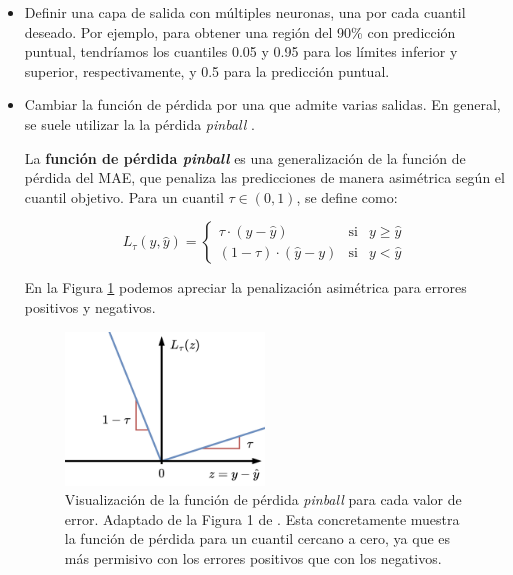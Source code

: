 \begin{itemize}

    \item Definir una capa de salida con múltiples neuronas, una por cada cuantil deseado. Por ejemplo, para 
    obtener una región del 90\% con predicción puntual, tendríamos los cuantiles 0.05 y 0.95 para los límites
    inferior y superior, respectivamente, y 0.5 para la predicción puntual. 

    \item Cambiar la función de pérdida por una que admite varias salidas. En general, se suele utilizar la 
    la pérdida \textit{pinball} \cite{steinwart2011}.

    La \textbf{función de pérdida \textit{pinball}} es una generalización de la función de pérdida del MAE,
    que penaliza las predicciones de manera asimétrica según el cuantil objetivo. Para un cuantil 
    $\tau \in \left( 0,1\right)$, se define como:


    $$
    L_\tau(y,\hat{y}) = \left\{
        \begin{array}{rcl}
            \tau \cdot (y-\hat{y}) & \mbox{si} & y \ge \hat{y}
            \\
            (1-\tau) \cdot (\hat{y}-y) & \mbox{si} & y < \hat{y}
        \end{array}
    \right.
    $$

    En la Figura \ref{fig:pinball_loss} podemos apreciar la penalización asimétrica para errores positivos y 
    negativos. 

    \begin{figure}[h]
        \centering
        \includegraphics[width=0.5\textwidth]{capitulos/cap_04/imagenes/pinball_loss.png}
        \caption[
            Visualización de la función de pérdida \textit{pinball} para cada valor de error.
        ]{
            Visualización de la función de pérdida \textit{pinball} para cada valor de error.
            Adaptado de la Figura 1 de \cite{romano2019}.
            Esta concretamente muestra la función de pérdida para un cuantil cercano a cero, 
            ya que es más permisivo con los errores positivos que con los negativos.
        } 
        \label{fig:pinball_loss}
    \end{figure}


\end{itemize}
